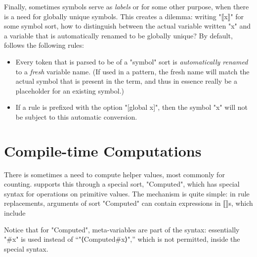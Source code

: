 \documentclass[11pt]{article} %
\begin{document}
Finally, sometimes symbols serve as \emph{labels} or for some other purpose, when there is a need
for globally unique symbols. This creates a dilemma: writing "⟦x⟧" for some symbol sort, how to
distinguish between the actual variable written "x" and a variable that is automatically renamed to
be globally unique? By default, \HAX follows the following rules:
\begin{itemize}

\item Every token that is parsed to be of a "symbol" sort is \emph{automatically renamed} to a
  \emph{fresh} variable name. (If used in a pattern, the fresh name will match the actual symbol
  that is present in the term, and thus in essence really be a placeholder for an existing symbol.)

\item If a rule is prefixed with the option "[global x]", then the symbol "x" will not be subject to
  this automatic conversion.

\end{itemize}


\section{Compile-time Computations}
\label{sec:comp}

There is sometimes a need to compute helper values, most commonly for counting. \HAX supports this
through a special sort, "Computed", which has special syntax for operations on primitive values.
The mechanism is quite simple: in rule replacements, arguments of sort "Computed" can contain
expressions in ⟦⟧s, which include
Notice that for "Computed", meta-variables are part of the syntax: essentially "#x" is used instead
of ``"⟨Computed#x⟩",'' which is not permitted, inside the special syntax.
\end{document}
